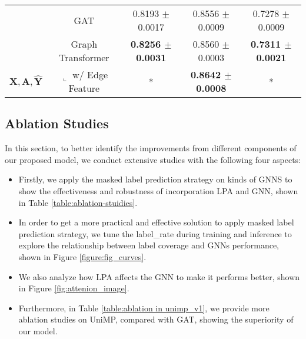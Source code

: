 \begin{table*}[htbp]
{\begin{tabular}{c|c|c|c|c}
		& GAT    &      0.8193 $\pm$ 0.0017            &         0.8556  $\pm$ 0.0009              &               0.7278 $\pm$ 0.0009    \\
		& Graph Transformer  &       \bf{0.8256} $\pm$ \bf{0.0031}              &    0.8560 $\pm$ 0.0003                   &   \bf{0.7311} $\pm$ \bf{ 0.0021 }   \\
		\multirow{-4}{*}{$\mathbf{X,A,\hat{Y}}$}  & \text{\ \ \ \ \ \  \ \ \ \ }$\llcorner$ w/ Edge Feature                      & *  &    \bf{0.8642} $\pm$ \bf{0.0008}    &  * \\
		\hline
	\end{tabular}
	}

	\caption{This is the ablation studies on models with different inputs, where
$\mathbf{X}$ denotes the nodes features, $\mathbf{A}$ is the graph adjacent matrix and $\mathbf{\hat{Y}}$ is the observed labels. In \emph{ogbn-proteins}, nodes features are not provided initially. We average the edge features as their nodes features and provide the experimental result of Transformer without edge features for fair comparison in this experiment, which is slightly different from Table \ref{table:ret_proteins}.
}
 \label{table:ablation-stuidies}
 \vspace{-4mm}
\end{table*}
 
 \subsection{Ablation Studies}
 In this section, to better identify the improvements from different components of our proposed model, we conduct extensive studies with the following four aspects:
 


\begin{itemize}
 	\item Firstly, we apply the masked label prediction strategy on kinds of GNNS to show the effectiveness and robustness of incorporation LPA and GNN, shown in Table \ref{table:ablation-stuidies}.
 	\item In order to get a more practical and effective solution to apply masked label prediction strategy, we tune the label\_rate during training and inference to explore the relationship between label coverage and GNNs performance, shown in Figure \ref{figure:fig_curves}.
\item We also analyze how LPA affects the GNN to make it performs better, shown in Figure \ref{fig:attenion_image}.
 	\item Furthermore, in Table \ref{table:ablation in unimp_v1}, we provide more ablation studies on UniMP, compared with GAT, showing the superiority of our model. 
\end{itemize}
 
